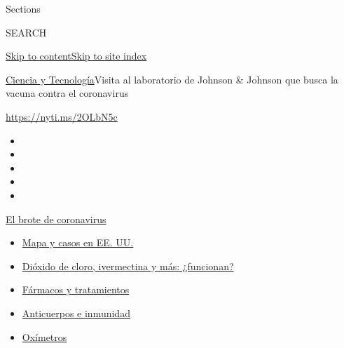 Sections

SEARCH

\protect\hyperlink{site-content}{Skip to
content}\protect\hyperlink{site-index}{Skip to site index}

\href{/es/section/ciencia-y-tecnologia}{Ciencia y
Tecnología}\textbar{}Visita al laboratorio de Johnson \& Johnson que
busca la vacuna contra el coronavirus

\url{https://nyti.ms/2OLbN5c}

\begin{itemize}
\item
\item
\item
\item
\item
\end{itemize}

\href{https://www.nytimes3xbfgragh.onion/es/spotlight/coronavirus?action=click\&pgtype=Article\&state=default\&region=TOP_BANNER\&context=storylines_menu}{El
brote de coronavirus}

\begin{itemize}
\tightlist
\item
  \href{https://www.nytimes3xbfgragh.onion/es/interactive/2020/espanol/mundo/coronavirus-en-estados-unidos.html?action=click\&pgtype=Article\&state=default\&region=TOP_BANNER\&context=storylines_menu}{Mapa
  y casos en EE. UU.}
\item
  \href{https://www.nytimes3xbfgragh.onion/es/2020/07/23/espanol/america-latina/bolivia-cloro-coronavirus-ivermectina.html?action=click\&pgtype=Article\&state=default\&region=TOP_BANNER\&context=storylines_menu}{Dióxido
  de cloro, ivermectina y más: ¿funcionan?}
\item
  \href{https://www.nytimes3xbfgragh.onion/es/interactive/2020/science/coronavirus-tratamientos-curas.html?action=click\&pgtype=Article\&state=default\&region=TOP_BANNER\&context=storylines_menu}{Fármacos
  y tratamientos}
\item
  \href{https://www.nytimes3xbfgragh.onion/es/2020/07/28/espanol/ciencia-y-tecnologia/anticuerpos-coronavirus-inmunidad.html?action=click\&pgtype=Article\&state=default\&region=TOP_BANNER\&context=storylines_menu}{Anticuerpos
  e inmunidad}
\item
  \href{https://www.nytimes3xbfgragh.onion/es/2020/04/29/espanol/estilos-de-vida/oximetro-para-que-sirve.html?action=click\&pgtype=Article\&state=default\&region=TOP_BANNER\&context=storylines_menu}{Oxímetros}
\end{itemize}


